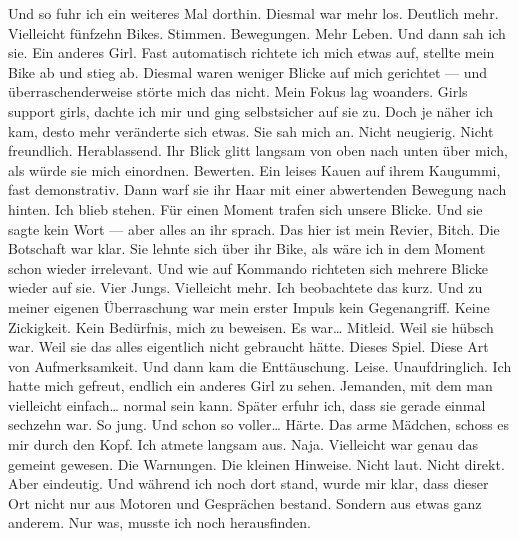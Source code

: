 Und so fuhr ich ein weiteres Mal dorthin.
Diesmal war mehr los.
Deutlich mehr.
Vielleicht fünfzehn Bikes. Stimmen. Bewegungen. Mehr Leben.
Und dann sah ich sie.
Ein anderes Girl.
Fast automatisch richtete ich mich etwas auf, stellte mein Bike ab und stieg ab.
Diesmal waren weniger Blicke auf mich gerichtet — und überraschenderweise störte mich das nicht.
Mein Fokus lag woanders.
Girls support girls, dachte ich mir und ging selbstsicher auf sie zu.
Doch je näher ich kam, desto mehr veränderte sich etwas.
Sie sah mich an.
Nicht neugierig.
Nicht freundlich.
Herablassend.
Ihr Blick glitt langsam von oben nach unten über mich, als würde sie mich einordnen. Bewerten.
Ein leises Kauen auf ihrem Kaugummi, fast demonstrativ. Dann warf sie ihr Haar mit einer abwertenden Bewegung nach hinten.
Ich blieb stehen.
Für einen Moment trafen sich unsere Blicke.
Und sie sagte kein Wort —
aber alles an ihr sprach.
Das hier ist mein Revier, Bitch.
Die Botschaft war klar.
Sie lehnte sich über ihr Bike, als wäre ich in dem Moment schon wieder irrelevant.
Und wie auf Kommando richteten sich mehrere Blicke wieder auf sie.
Vier Jungs. Vielleicht mehr.
Ich beobachtete das kurz.
Und zu meiner eigenen Überraschung war mein erster Impuls kein Gegenangriff.
Keine Zickigkeit. Kein Bedürfnis, mich zu beweisen.
Es war… Mitleid.
Weil sie hübsch war.
Weil sie das alles eigentlich nicht gebraucht hätte.
Dieses Spiel.
Diese Art von Aufmerksamkeit.
Und dann kam die Enttäuschung.
Leise.
Unaufdringlich.
Ich hatte mich gefreut, endlich ein anderes Girl zu sehen.
Jemanden, mit dem man vielleicht einfach… normal sein kann.
Später erfuhr ich, dass sie gerade einmal sechzehn war.
So jung.
Und schon so voller… Härte.
Das arme Mädchen, schoss es mir durch den Kopf.
Ich atmete langsam aus.
Naja.
Vielleicht war genau das gemeint gewesen.
Die Warnungen.
Die kleinen Hinweise.
Nicht laut. Nicht direkt.
Aber eindeutig.
Und während ich noch dort stand, wurde mir klar,
dass dieser Ort nicht nur aus Motoren und Gesprächen bestand.
Sondern aus etwas ganz anderem. Nur was, musste ich noch herausfinden.

